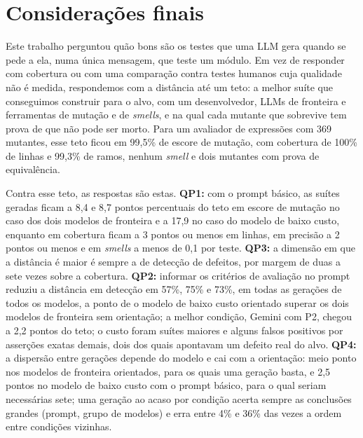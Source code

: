 \chapter{Considerações finais}
\label{cap:consideracoes}

Este trabalho perguntou quão bons são os testes que uma LLM gera quando se pede a ela, numa única mensagem, que teste um módulo. Em vez de responder com cobertura ou com uma comparação contra testes humanos cuja qualidade não é medida, respondemos com a distância até um teto: a melhor suíte que conseguimos construir para o alvo, com um desenvolvedor, LLMs de fronteira e ferramentas de mutação e de \textit{smells}, e na qual cada mutante que sobrevive tem prova de que não pode ser morto. Para um avaliador de expressões com 369 mutantes, esse teto ficou em 99,5\% de escore de mutação, com cobertura de 100\% de linhas e 99,3\% de ramos, nenhum \textit{smell} e dois mutantes com prova de equivalência.

Contra esse teto, as respostas são estas. \textbf{QP1:} com o prompt básico, as suítes geradas ficam a 8,4 e 8,7 pontos percentuais do teto em escore de mutação no caso dos dois modelos de fronteira e a 17,9 no caso do modelo de baixo custo, enquanto em cobertura ficam a 3 pontos ou menos em linhas, em precisão a 2 pontos ou menos e em \textit{smells} a menos de 0,1 por teste. \textbf{QP3:} a dimensão em que a distância é maior é sempre a de detecção de defeitos, por margem de duas a sete vezes sobre a cobertura. \textbf{QP2:} informar os critérios de avaliação no prompt reduziu a distância em detecção em 57\%, 75\% e 73\%, em todas as gerações de todos os modelos, a ponto de o modelo de baixo custo orientado superar os dois modelos de fronteira sem orientação; a melhor condição, Gemini com P2, chegou a 2,2 pontos do teto; o custo foram suítes maiores e alguns falsos positivos por asserções exatas demais, dois dos quais apontavam um defeito real do alvo. \textbf{QP4:} a dispersão entre gerações depende do modelo e cai com a orientação: meio ponto nos modelos de fronteira orientados, para os quais uma geração basta, e 2,5 pontos no modelo de baixo custo com o prompt básico, para o qual seriam necessárias sete; uma geração ao acaso por condição acerta sempre as conclusões grandes (prompt, grupo de modelos) e erra entre 4\% e 36\% das vezes a ordem entre condições vizinhas.

